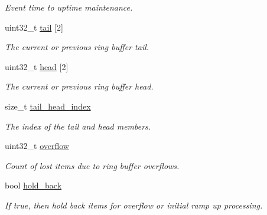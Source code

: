 \begin{DoxyCompactItemize}
\begin{tabbing}
\end{tabbing}\begin{DoxyCompactList}\small\item\em Event time to uptime maintenance. \end{DoxyCompactList}\item 
uint32\+\_\+t \mbox{\hyperlink{structrtems__record__client__per__cpu_a59dbb9d3e3f5ed2a50e9ac3e266e2ad4}{tail}} \mbox{[}2\mbox{]}
\begin{DoxyCompactList}\small\item\em The current or previous ring buffer tail. \end{DoxyCompactList}\item 
uint32\+\_\+t \mbox{\hyperlink{structrtems__record__client__per__cpu_a52b2ef1058a1fa5e5cd0a0be6f955e4a}{head}} \mbox{[}2\mbox{]}
\begin{DoxyCompactList}\small\item\em The current or previous ring buffer head. \end{DoxyCompactList}\item 
size\+\_\+t \mbox{\hyperlink{structrtems__record__client__per__cpu_a15f079666f41a7b1182f84a1011f1194}{tail\+\_\+head\+\_\+index}}
\begin{DoxyCompactList}\small\item\em The index of the tail and head members. \end{DoxyCompactList}\item 
\mbox{\label{structrtems__record__client__per__cpu_a8cac7df8d0f3749b6bedcb599f1a2864}} 
uint32\+\_\+t \mbox{\hyperlink{structrtems__record__client__per__cpu_a8cac7df8d0f3749b6bedcb599f1a2864}{overflow}}
\begin{DoxyCompactList}\small\item\em Count of lost items due to ring buffer overflows. \end{DoxyCompactList}\item 
\mbox{\label{structrtems__record__client__per__cpu_a5affbacdc564e44eb2e21cd5992f59b1}} 
bool \mbox{\hyperlink{structrtems__record__client__per__cpu_a5affbacdc564e44eb2e21cd5992f59b1}{hold\+\_\+back}}
\begin{DoxyCompactList}\small\item\em If true, then hold back items for overflow or initial ramp up processing. \end{DoxyCompactList}\item 

\end{DoxyCompactItemize}
